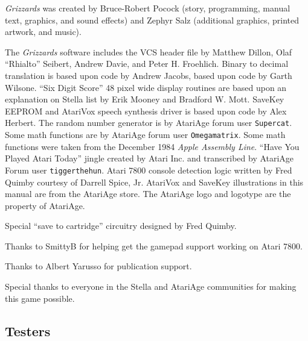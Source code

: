 \documentclass[10pt,twocolumn,openany,article]{memoir}
\begin{document}
\fi

\fi %


\vfill


\pagebreak


\textit{Grizzards}   was   created   by  Bruce-Robert   Pocock   (story,
programming, manual text,  graphics, and sound effects)  and Zephyr Salz
(additional graphics, printed artwork, and music).

The \textit{Grizzards} software includes the  VCS header file by Matthew
Dillon, Olaf ``Rhialto'' Seibert, Andrew  Davie, and Peter H. Froehlich.
Binary to decimal translation is based upon code by Andrew Jacobs, based
upon code  by Garth Wilsone. ``Six  Digit Score'' 48 pixel  wide display
routines are based upon an explanation on Stella list by Erik Mooney and
Bradford W.  Mott. \ifdefined\ATARIAGESAVE\else  SaveKey EEPROM  and \fi{}
AtariVox speech  synthesis driver  is based upon  code by  Alex Herbert.
The random number generator is by AtariAge forum user \texttt{Supercat}.
Some math  functions are by AtariAge  forum user \texttt{Omega\-matrix}.
Some  math functions  were taken  from the  December 1984  \textit{Apple
  Assembly  Line}. ``Have  You Played  Atari Today''  jingle created  by
Atari    Inc.     and    transcribed    by    AtariAge     Forum    user
\texttt{tigger\-the\-hun}. Atari 7800 console detection logic written by
Fred      Quimby      courtesy      of      Darrell      Spice,      Jr.
AtariVox \ifdefined\ATARIAGESAVE\else and SaveKey \fi{}
illustrations   in   this   manual   are  from   the   AtariAge   store.
\ifdefined\ATARIAGESAVE The AtariAge logo  and logotype are the property
of AtariAge. \fi

Special ``save to cartridge'' circuitry designed by Fred Quimby.

Thanks to SmittyB for helping get the gamepad support working on Atari 7800.

Thanks to Albert Yarusso for publication support.

Special thanks  to everyone in  the Stella and AtariAge  communities for
making this game possible.

\vspace{30pt}

\subsection{Testers}
\end{document}
